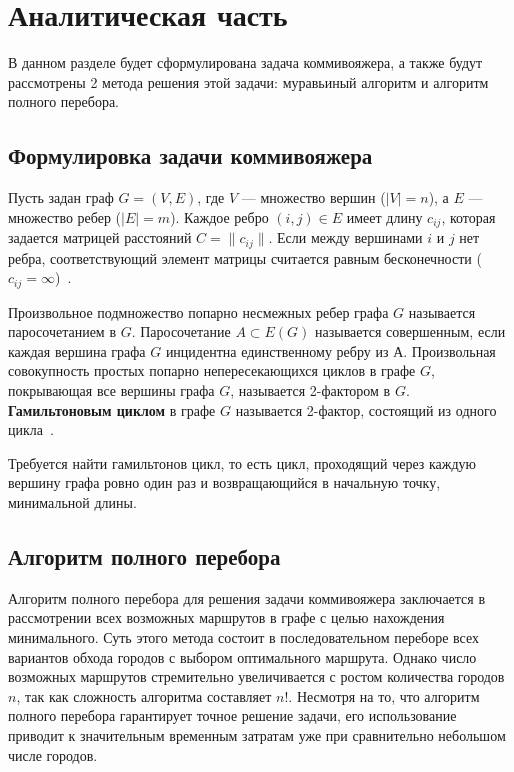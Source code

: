 \chapter{Аналитическая часть}

В данном разделе будет сформулирована задача коммивояжера, а также будут рассмотрены 2 метода решения этой задачи: муравьиный алгоритм и алгоритм полного перебора.

\section{Формулировка задачи коммивояжера}

Пусть задан граф $G = (V, E)$, где $V$ — множество вершин ($|V| = n$), а $E$ — множество ребер ($|E| = m$). Каждое ребро $(i, j) \in E$ имеет длину $c_{ij}$, которая задается матрицей расстояний $C = \|c_{ij}\|$. Если между вершинами $i$ и $j$ нет ребра, соответствующий элемент матрицы считается равным бесконечности ($c_{ij} = \infty$)~\cite{com_info}.

Произвольное подмножество попарно несмежных ребер графа $G$ называется паросочетанием в $G$. Паросочетание $A \subset E(G)$ называется совершенным, если каждая вершина графа $G$ инцидентна единственному ребру из $А$. Произвольная совокупность простых попарно непересекающихся циклов в графе $G$, покрывающая все вершины графа $G$, называется 2-фактором в $G$. \textbf{Гамильтоновым циклом} в графе $G$ называется 2-фактор, состоящий из одного цикла~\cite{gamelton}.

Требуется найти гамильтонов цикл, то есть цикл, проходящий через каждую вершину графа ровно один раз и возвращающийся в начальную точку, минимальной длины.

\section{Алгоритм полного перебора}

Алгоритм полного перебора для решения задачи коммивояжера заключается в рассмотрении всех возможных маршрутов в графе с целью нахождения минимального. Суть этого метода состоит в последовательном переборе всех вариантов обхода городов с выбором оптимального маршрута. Однако число возможных маршрутов стремительно увеличивается с ростом количества городов $n$, так как сложность алгоритма составляет $n!$. Несмотря на то, что алгоритм полного перебора гарантирует точное решение задачи, его использование приводит к значительным временным затратам уже при сравнительно небольшом числе городов.

